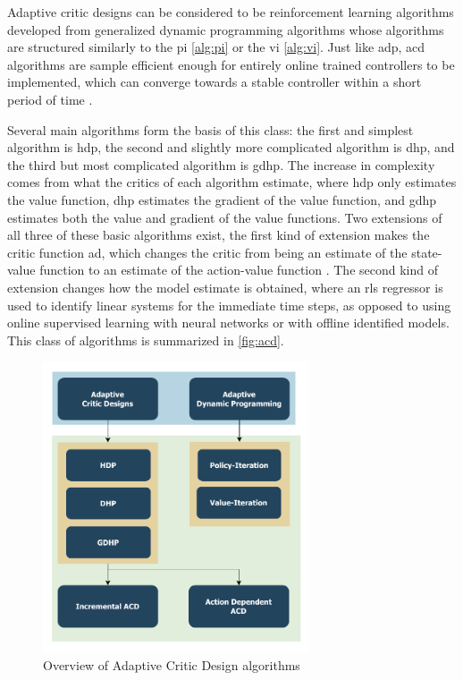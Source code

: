 \documentclass[../report.tex]{subfiles}
\begin{document}
Adaptive critic designs can be considered to be reinforcement learning algorithms developed from generalized dynamic programming algorithms \cite{old_acd} whose algorithms are structured similarly to the \ac{pi} \autoref{alg:pi} or the \ac{vi} \autoref{alg:vi}. Just like \ac{adp}, \ac{acd} algorithms are sample efficient enough for entirely online trained controllers to be implemented, which can converge towards a stable controller within a short period of time \cite{tshdp, mshdp_og, adp_for_control}. 

Several main algorithms form the basis of this class: the first and simplest algorithm is \ac{hdp}, the second and slightly more complicated algorithm is \ac{dhp}, and the third but most complicated algorithm is \ac{gdhp}. The increase in complexity comes from what the critics of each algorithm estimate, where \ac{hdp} only estimates the value function, \ac{dhp} estimates the gradient of the value function, and \ac{gdhp} estimates both the value and gradient of the value functions. Two extensions of all three of these basic algorithms exist, the first kind of extension makes the critic function \ac{ad}, which changes the critic from being an estimate of the state-value function to an estimate of the action-value function \cite{og_action_dependent}. The second kind of extension changes how the model estimate is obtained, where an \ac{rls} regressor is used to identify linear systems for the immediate time steps, as opposed to using online supervised learning with neural networks or with offline identified models. This class of algorithms is summarized in \autoref{fig:acd}.

\begin{figure}[H]
    \centering
    \includegraphics[width=0.7\textwidth]{figures/01/acd.pdf}
    \caption{Overview of Adaptive Critic Design algorithms}
    \label{fig:acd}
\end{figure}
\end{document}
